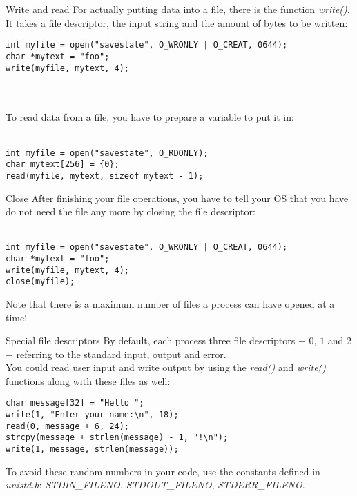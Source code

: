 \begin{frame}[fragile]{Write and read}
	For actually putting data into a file, there is the function \textit{write()}.\\
	It takes a file descriptor, the input string and the amount of bytes to be written:\bigskip
	
	\begin{lstlisting}
int myfile = open("savestate", O_WRONLY | O_CREAT, 0644);
char *mytext = "foo";
write(myfile, mytext, 4);
\end{lstlisting}\ \\\ \\

	To read data from a file, you have to prepare a variable to put it in:\\\ \\
	
	\begin{lstlisting}
int myfile = open("savestate", O_RDONLY);
char mytext[256] = {0};
read(myfile, mytext, sizeof mytext - 1);
\end{lstlisting}
	
\end{frame}

\begin{frame}[fragile]{Close}
	After finishing your file operations, you have to tell your OS that you have do not need the file any more by closing the file descriptor:\\\ \\
	
	\begin{lstlisting}
int myfile = open("savestate", O_WRONLY | O_CREAT, 0644);
char *mytext = "foo";
write(myfile, mytext, 4);
close(myfile);
\end{lstlisting}\bigskip
	Note that there is a maximum number of files a process can have opened at a time!
\end{frame}

\begin{frame}[fragile]{Special file descriptors}
	By default, each process three file descriptors $-$ $0$, $1$ and $2$ $-$ referring to the standard input, output and error.\\
	You could read user input and write output by using the \textit{read()} and \textit{write()} functions along with these files as well:\bigskip
	\begin{lstlisting}
char message[32] = "Hello ";
write(1, "Enter your name:\n", 18);
read(0, message + 6, 24);
strcpy(message + strlen(message) - 1, "!\n");
write(1, message, strlen(message));
\end{lstlisting}\bigskip
	
	To avoid these random numbers in your code, use the constants defined in \textit{unistd.h}: \textit{STDIN\_FILENO}, \textit{STDOUT\_FILENO}, \textit{STDERR\_FILENO}.

\end{frame}

